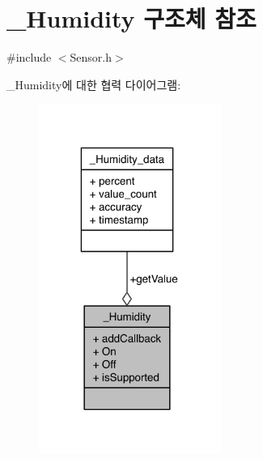 \hypertarget{struct___humidity}{\section{\-\_\-\-Humidity 구조체 참조}
\label{struct___humidity}
}


{\ttfamily \#include $<$Sensor.\-h$>$}



\-\_\-\-Humidity에 대한 협력 다이어그램\-:
\nopagebreak
\begin{figure}[H]
\begin{center}
\leavevmode
\includegraphics[width=169pt]{d7/d6b/struct___humidity__coll__graph}
\end{center}
\end{figure}

